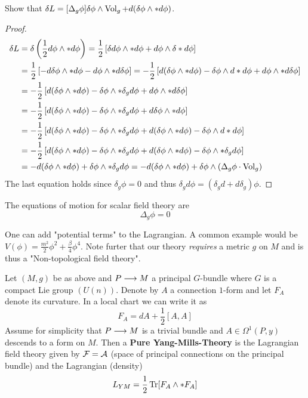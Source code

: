 \begin{ex}
  Show that $ \delta L = [\Delta_g \phi] \delta \phi \wedge \vol_g + d(\delta\phi \wedge * d\phi)$.
\begin{proof}
  \begin{align*}
    \delta L &= \delta \left( \frac{1}{2} d \phi \wedge * d\phi \right) = \frac{1}{2} \left[ \delta d \phi \wedge *d\phi + d\phi\wedge \delta * d \phi \right] \\
    &= \frac{1}{2} \left[ -d \delta \phi \wedge *d\phi - d\phi\wedge * d \delta \phi \right] = -\frac{1}{2} \left[ d( \delta \phi \wedge *d\phi) - \delta \phi \wedge d*d\phi + d\phi\wedge * d \delta \phi \right] \\
    &= -\frac{1}{2} \left[ d( \delta \phi \wedge *d\phi) - \delta \phi \wedge *\delta_g d\phi + d\phi\wedge * d \delta \phi \right]\\
    &= -\frac{1}{2} \left[ d( \delta \phi \wedge *d\phi) - \delta \phi \wedge *\delta_g d\phi + d \delta \phi\wedge * d\phi \right]\\
    &= -\frac{1}{2} \left[ d( \delta \phi \wedge *d\phi) - \delta \phi \wedge *\delta_g d\phi + d(\delta \phi \wedge *d\phi) - \delta \phi \wedge d*d\phi \right] \\
    &= -\frac{1}{2} \left[ d( \delta \phi \wedge *d\phi) - \delta \phi \wedge *\delta_g d\phi + d(\delta \phi \wedge *d\phi) - \delta \phi \wedge *\delta_g d \phi \right] \\
    &= - d( \delta \phi \wedge *d\phi) + \delta \phi \wedge *\delta_g d\phi = - d( \delta \phi \wedge *d\phi) + \delta \phi \wedge (\Delta_g \phi \cdot \vol_g)
  \end{align*}
  The last equation holds since $\delta_g \phi = 0$ and thus $\delta_g d \phi = (\delta_g d + d \delta_g) \phi$.
\end{proof}
\end{ex}

The equations of motion for scalar field theory are
$$ \Delta_g \phi = 0 $$

\begin{rem}
  One can add "potential terms" to the Lagrangian. A common example would be $V(\phi) = \frac{m^2}{2} \phi^2 + \frac{\beta}{4} \phi^4$. Note furter that our theory \emph{requires} a metric $g$ on $M$ and is thus a "Non-topological field theory".
\end{rem}

\begin{definition}
  Let $(M,g)$ be as above and $P \longrightarrow M$ a principal $G$-bundle where $G$ is a compact Lie group $(U(n))$. Denote by $A$ a connection $1$-form and let $F_A$ denote its curvature. In a local chart we can write it as
  $$ F_A = dA + \frac{1}{2}[A,A] $$
  Assume for simplicity that $P \longrightarrow M$ is a trivial bundle and $A \in \Omega^1(P,y)$ descends to a form on $M$. Then a \textbf{Pure Yang-Mills-Theory} is the Lagrangian field theory given by ${\mathcal{F}} = \mathcal{A}$ (space of principal connections on the principal bundle) and the Lagrangian (density)
  $$ L_{YM} = \frac{1}{2} \operatorname{Tr}[F_A \wedge * F_A] $$
\end{definition}

